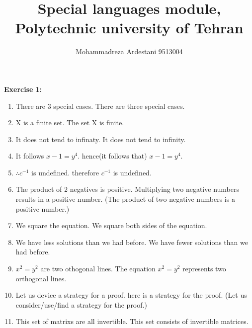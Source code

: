 \documentclass[11pt]{article}
\begin{document}
\author{Mohammadreza Ardestani 9513004}
\title{Special languages module, Polytechnic university of Tehran}
\maketitle

\medskip
	{\textbf{\huge Exercise 1:}}
\begin{enumerate}
\item
There are 3 special cases. \textrightarrow \hspace*{0.25cm}  There are three special cases.
\item
X is a finite set. \textrightarrow \hspace*{0.25cm} The set X is finite.
\item
It does not tend to infinaty. \textrightarrow \hspace*{0.25cm} It does not tend to infinity.
\item
It follows $x-1=y^{4}$. \textrightarrow \hspace*{0.25cm} hence(it follows that) $x-1=y^{4}$.
\item
$\therefore c^{-1}$ is undefined. \textrightarrow \hspace*{0.25cm} therefore $c^{-1}$ is undefined.
\item
The product of 2 negatives is positive. \textrightarrow \hspace*{0.25cm} Multiplying two negative numbers results in a positive number. (The product of two negative numbers is a positive number.)
\item
We square the equation. \textrightarrow \hspace*{0.25cm} We square both sides of the equation.
\item
We have less solutions than we had before. \textrightarrow \hspace*{0.25cm}	We have fewer solutions than we had before.
\item
$x^{2} = y^{2}$ are two othogonal lines. \textrightarrow \hspace*{0.25cm} The equation $x^{2}=y^{2}$ represents two orthogonal lines.
\item
Let us device a strategy for a proof. \textrightarrow \hspace*{0.25cm} here is a strategy for the proof. (Let us consider/use/find a strategy for the proof.)
\item
This set of matrixs are all invertible. \textrightarrow \hspace*{0.25cm} This set consists of invertible matrices.

\end{enumerate}
\end{document}
